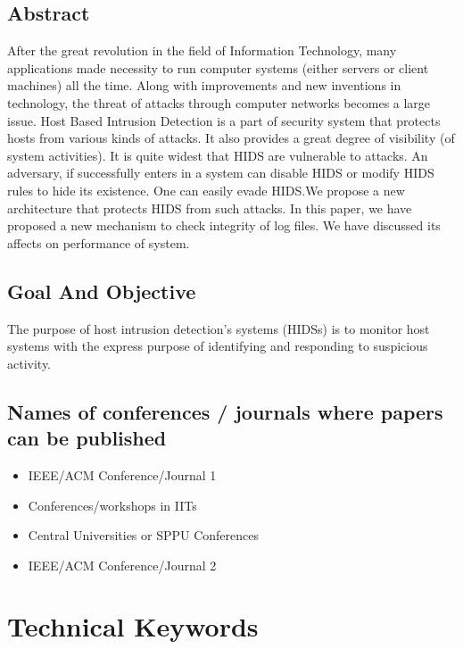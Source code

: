 \documentclass[12pt,a4paper]{report}
\begin{document}
\section{Abstract}
After the great revolution in the field of Information Technology, many applications made necessity to run computer systems (either servers or client machines) all the time. Along with improvements and new inventions in technology, the threat of attacks through computer networks becomes a large issue. Host Based Intrusion Detection is a part of security system that protects hosts from various kinds of attacks. It also provides a great degree of visibility (of system activities). It is quite widest that HIDS are vulnerable to attacks. An adversary, if successfully enters in a system can disable HIDS or modify HIDS rules to hide its existence. One can easily evade HIDS.We propose a new architecture that protects HIDS from such attacks. In this paper, we have proposed a new mechanism to check integrity of log files. We have discussed its affects on performance of system. 

\section{Goal And Objective}
The purpose of host intrusion detection's systems (HIDSs) is to monitor host systems with the express purpose of identifying and responding to suspicious activity.
\section{Names of conferences / journals where papers can be published}
\begin{itemize}
\item IEEE/ACM Conference/Journal 1
\item Conferences/workshops in IITs
\item Central Universities or SPPU Conferences
\item IEEE/ACM Conference/Journal 2
\end{itemize}

\newpage
\chapter{Technical Keywords}
\newpage
\end{document}

